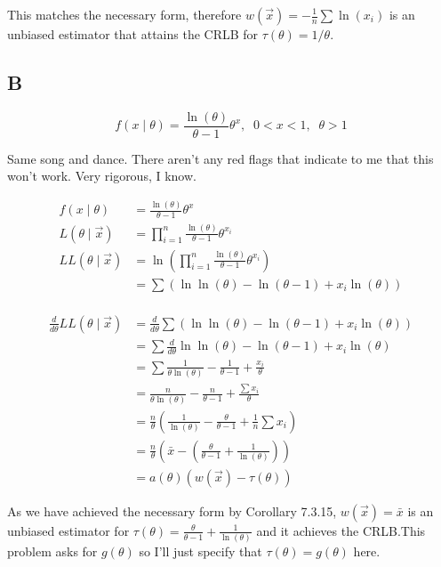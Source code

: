 This matches the necessary form, therefore $w(\vec{x}) = -\frac{1}{n}\sum \ln(x_i)$ is an unbiased estimator that attains the CRLB for $\tau(\theta) = 1/\theta$.

\subsection*{B}

\[
	f(x \mid \theta) = \frac{\ln(\theta)}{\theta - 1} \theta^x, \;\; 0 < x < 1, \;\; \theta > 1
\]

Same song and dance. There aren't any red flags that indicate to me that this won't work. Very rigorous, I know. 

\begin{align*}
	f(x \mid \theta) &= \frac{\ln(\theta)}{\theta - 1} \theta^x \\
	L(\theta \mid \vec{x}) &= \prod_{i=1}^n \frac{\ln(\theta)}{\theta - 1} \theta^{x_i} \\
	LL(\theta \mid \vec{x}) &= \ln \left( \prod_{i=1}^n \frac{\ln(\theta)}{\theta - 1} \theta^{x_i} \right) \\
	&= \sum \left( \ln\ln(\theta) - \ln(\theta - 1) + x_i \ln(\theta) \right) \\
\end{align*}

\begin{align*}
	\frac{d}{d\theta} LL(\theta \mid \vec{x}) &= \frac{d}{d\theta} \sum \left( \ln\ln(\theta) - \ln(\theta - 1) + x_i \ln(\theta) \right) \\
	&= \sum \frac{d}{d\theta} \ln\ln(\theta) - \ln(\theta - 1) + x_i \ln(\theta) \\
	&= \sum \frac{1}{\theta\ln(\theta)} - \frac{1}{\theta - 1} + \frac{x_i}{\theta} \\
	&= \frac{n}{\theta\ln(\theta)} - \frac{n}{\theta - 1} + \frac{\sum x_i}{\theta} \\ 
	&= \frac{n}{\theta} \left( \frac{1}{\ln(\theta)} - \frac{\theta}{\theta - 1} + \frac{1}{n} \sum x_i \right) \\
	&= \frac{n}{\theta} \left( \bar{x} - \left( \frac{\theta}{\theta - 1} + \frac{1}{\ln(\theta)} \right) \right) \\
	&= a(\theta) \left( w(\vec{x}) - \tau(\theta) \right)
\end{align*}

As we have achieved the necessary form by Corollary 7.3.15, $w(\vec{x}) = \bar{x}$ is an unbiased estimator for $\tau(\theta) =  \frac{\theta}{\theta - 1} + \frac{1}{\ln(\theta)}$ and it achieves the CRLB.This problem asks for $g(\theta)$ so I'll just specify that $\tau(\theta) = g(\theta)$ here. 

